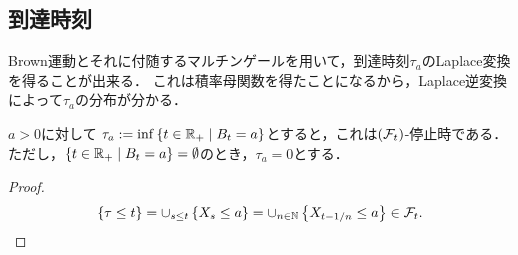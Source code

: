 \documentclass[uplatex,dvipdfmx]{jsreport}
\begin{document}
\subsection{到達時刻}

\begin{tcolorbox}[colframe=ForestGreen, colback=ForestGreen!10!white,breakable,colbacktitle=ForestGreen!40!white,coltitle=black,fonttitle=\bfseries\sffamily,
title=Markov過程の到達時刻はLaplace変換の有名な応用先である]
    Brown運動とそれに付随するマルチンゲールを用いて，到達時刻$\tau_a$のLaplace変換を得ることが出来る．
    これは積率母関数を得たことになるから，Laplace逆変換によって$\tau_a$の分布が分かる．
\end{tcolorbox}

\begin{lemma}[到達時刻]
    $a>0$に対して
    $\tau_a:=\inf\left\{t\in\mathbb{R}_+\mid B_t=a\right\}$とすると，これは$(\mathcal{F}_t)$-停止時である．
    ただし，$\left\{t\in\mathbb{R}_+\mid B_t=a\right\}=\emptyset$のとき，$\tau_a=0$とする．
\end{lemma}
\begin{proof}
    \[\{\tau\le t\}=\cup_{s\le t}\left\{X_s\le a\right\}=\cup_{n\in\mathbb{N}}\left\{X_{t-1/n}\le a\right\}\in\mathcal{F}_t.\]
\end{proof}
\end{document}
